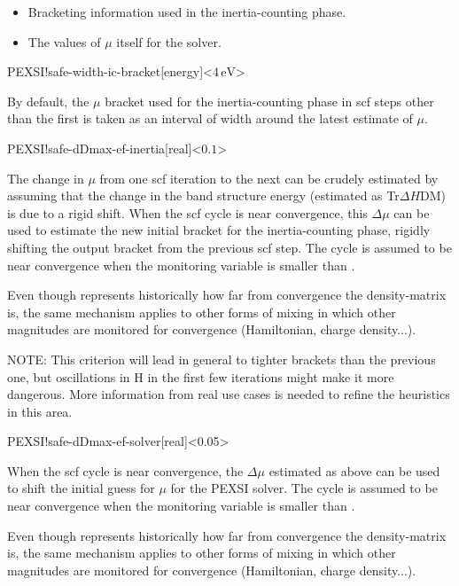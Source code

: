 \begin{itemize}
  \item%
  Bracketing information used in the inertia-counting phase.
  
  \item%
  The values of $\mu$ itself for the solver.
\end{itemize}

\begin{fdfentry}{PEXSI!safe-width-ic-bracket}[energy]<$4\,\mathrm{eV}$>

  By default, the $\mu$ bracket used for the inertia-counting phase in
  scf steps other than the first is taken as an interval of width
   around the latest estimate of
  $\mu$.
  
\end{fdfentry}


\begin{fdfentry}{PEXSI!safe-dDmax-ef-inertia}[real]<$0.1$>

  The change in $\mu$ from one scf iteration to the next can be
  crudely estimated by assuming that the change in the band structure
  energy (estimated as Tr$\Delta H$DM) is due to a rigid shift.  When
  the scf cycle is near convergence, this $\Delta\mu$ can be used to
  estimate the new initial bracket for the inertia-counting phase,
  rigidly shifting the output bracket from the previous scf step.  The
  cycle is assumed to be near convergence when the monitoring variable
   is smaller than .

  \note Even though  represents historically how far from
  convergence the density-matrix is, the same mechanism applies to
  other forms of mixing in which other magnitudes are monitored for
  convergence (Hamiltonian, charge density...).

  NOTE: This criterion will lead in general to tighter brackets than
  the previous one, but oscillations in H in the first few iterations
  might make it more dangerous. More information from real use cases
  is needed to refine the heuristics in this area.

\end{fdfentry}

\begin{fdfentry}{PEXSI!safe-dDmax-ef-solver}[real]<0.05>
  
  When the scf cycle is near convergence, the $\Delta\mu$ estimated as
  above can be used to shift the initial guess for $\mu$ for the PEXSI
  solver.  The cycle is assumed to be near convergence when the
  monitoring variable  is smaller than .

  \note Even though  represents historically how far from
  convergence the density-matrix is, the same mechanism applies to
  other forms of mixing in which other magnitudes are monitored for
  convergence (Hamiltonian, charge density...).

\end{fdfentry}


